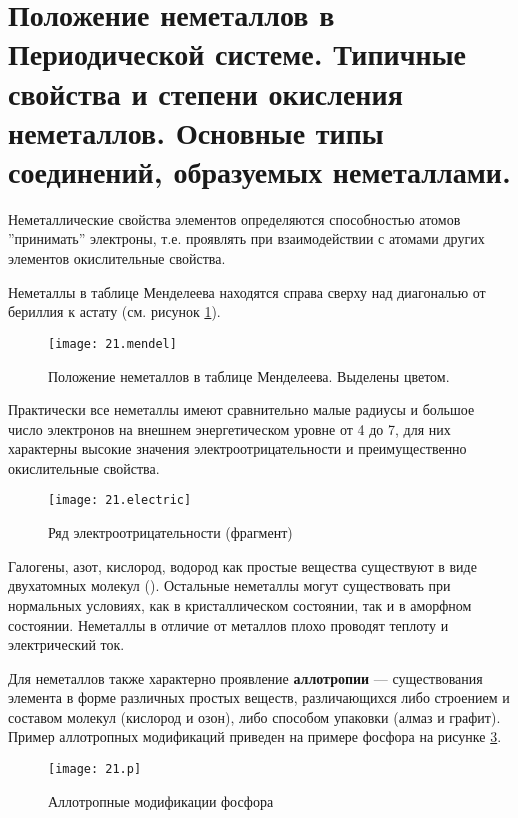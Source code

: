 \section{Положение неметаллов в Периодической системе. Типичные свойства и степени окисления неметаллов. Основные типы соединений, образуемых неметаллами.}

Неметаллические свойства элементов определяются способностью атомов ''принимать'' электроны, т.е. проявлять при взаимодействии с атомами других элементов окислительные свойства.

Неметаллы в таблице Менделеева находятся справа сверху над диагональю от бериллия к астату (см. рисунок \ref{fig:21.mendel}).

\begin{figure}[H]
	\centering
	\texttt{[image: 21.mendel]}
	\caption{Положение неметаллов в таблице Менделеева. Выделены цветом.}
	\label{fig:21.mendel}
\end{figure}

Практически все неметаллы имеют сравнительно малые радиусы и большое число электронов на внешнем энергетическом уровне от 4 до 7, для них характерны высокие значения электроотрицательности и преимущественно окислительные свойства.

\begin{figure}[H]
	\centering
	\texttt{[image: 21.electric]}
	\caption{Ряд электроотрицательности (фрагмент)}
	\label{fig:21.electric}
\end{figure}


Галогены, азот, кислород, водород как простые вещества существуют в виде двухатомных молекул (). Остальные неметаллы могут существовать при нормальных условиях, как в кристаллическом состоянии, так и в аморфном состоянии. Неметаллы в отличие от металлов плохо проводят теплоту и электрический ток.

Для неметаллов также характерно проявление \textbf{аллотропии} --- существования элемента в форме различных простых веществ, различающихся либо строением и составом молекул (кислород и озон), либо способом упаковки (алмаз и графит). Пример аллотропных модификаций приведен на примере фосфора на рисунке \ref{fig:21.p}.

\begin{figure}[H]
	\centering
	\texttt{[image: 21.p]}
	\caption{Аллотропные модификации фосфора}
	\label{fig:21.p}
\end{figure}

